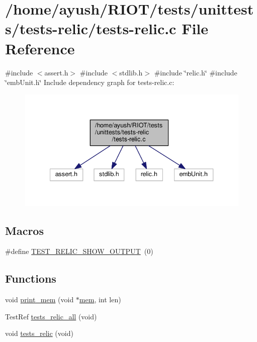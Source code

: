 \hypertarget{tests-relic_8c}{}\section{/home/ayush/\+R\+I\+O\+T/tests/unittests/tests-\/relic/tests-\/relic.c File Reference}
\label{tests-relic_8c}
{\ttfamily \#include $<$assert.\+h$>$}\newline
{\ttfamily \#include $<$stdlib.\+h$>$}\newline
{\ttfamily \#include \char`\"{}relic.\+h\char`\"{}}\newline
{\ttfamily \#include \char`\"{}emb\+Unit.\+h\char`\"{}}\newline
Include dependency graph for tests-\/relic.c\+:
\nopagebreak
\begin{figure}[H]
\begin{center}
\leavevmode
\includegraphics[width=340pt]{tests-relic_8c__incl}
\end{center}
\end{figure}
\subsection*{Macros}
\begin{DoxyCompactItemize}
\item 
\#define \hyperlink{tests-relic_8c_a55bd6715dfed9b14681069b5b440bffb}{T\+E\+S\+T\+\_\+\+R\+E\+L\+I\+C\+\_\+\+S\+H\+O\+W\+\_\+\+O\+U\+T\+P\+UT}~(0)
\end{DoxyCompactItemize}
\subsection*{Functions}
\begin{DoxyCompactItemize}
\item 
void \hyperlink{tests-relic_8c_a5516d9ea41ecebaf5ff5797e5f967baa}{print\+\_\+mem} (void $\ast$\hyperlink{structmem}{mem}, int len)
\item 
Test\+Ref \hyperlink{tests-relic_8c_ad3f0401881c5a3e820a7d174eeade913}{tests\+\_\+relic\+\_\+all} (void)
\item 
void \hyperlink{tests-relic_8c_a43bbbcfe05980402888d230537315cf3}{tests\+\_\+relic} (void)
\end{DoxyCompactItemize}


